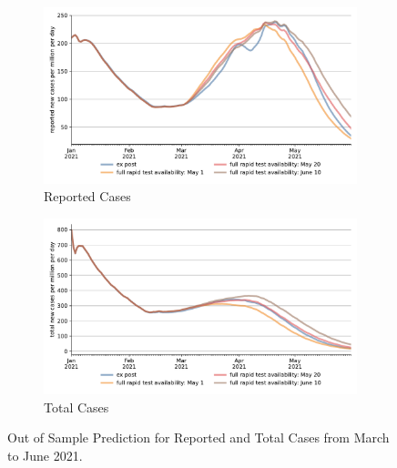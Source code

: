 \begin{figure}[ht] %
  \centering
  \begin{subfigure}[b]{.425\textwidth}
    \centering
    \includegraphics[width=\textwidth]{figures/results/figures/scenario_comparisons/robustness_check/full_new_known_case}
    \caption{Reported Cases}
    \label{fig:robustness_check_new_known_case}
  \end{subfigure}%
  \hfill
  \begin{subfigure}[b]{.425\textwidth}
    \centering
    \includegraphics[width=\textwidth]{figures/results/figures/scenario_comparisons/robustness_check/full_newly_infected}
    \caption{Total Cases}
    \label{fig:robustness_check_newly_infected}
  \end{subfigure}
  \caption{Out of Sample Prediction for Reported and Total Cases from March to June
  2021.}
  \label{fig:robustness_check_detailed}
\end{figure}
